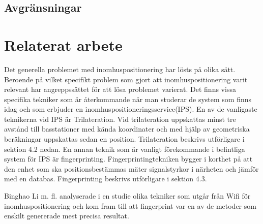 \documentclass[swedish, a4paper,12pt]{article}
\begin{document}

\subsection{Avgränsningar}

\section{Relaterat arbete}
Det generella problemet med inomhuspositionering har lösts på olika sätt.
Beroende på vilket specifikt problem som gjort att inomhuspositionering varit relevant har angreppssättet för att lösa problemet varierat. Det finns vissa specifika tekniker som är återkommande när man studerar de system som finns idag och som erbjuder en inomhuspositioneringsservice(IPS)\cite{IP1}.
En av de vanligaste teknikerna vid IPS är Trilateration. Vid trilateration uppskattas minst tre avstånd till basstationer med kända koordinater och med hjälp av geometriska beräkningar uppskattas sedan en position. Trilateration beskrivs utförligare i sektion 4.2 nedan. En annan teknik som är vanligt förekommande i befintliga system för IPS är fingerprinting. Fingerprintingtekniken bygger i korthet på att den enhet som ska positionsbestämmas mäter signalstyrkor i närheten och jämför med en databas. Fingerprinting beskrivs utförligare i sektion 4.3.

Binghao Li m. fl. analyserade i en studie \cite{IP1} olika tekniker som utgår från Wifi för inomhuspositionering och kom fram till att fingerprint var en av de metoder som enskilt genererade mest precisa resultat.
\end{document}

